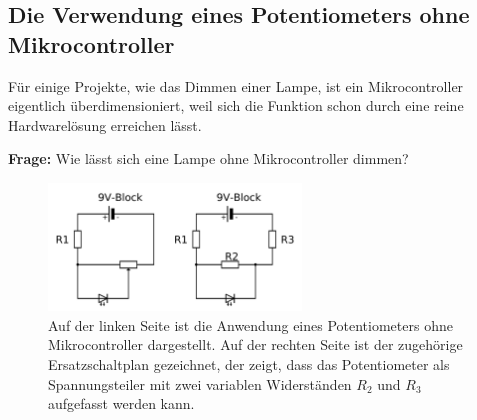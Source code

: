 \subsection{Die Verwendung eines Potentiometers ohne Mikrocontroller}

Für einige Projekte, wie das Dimmen einer Lampe, ist ein Mikrocontroller eigentlich überdimensioniert, weil sich die Funktion schon durch eine reine Hardwarelösung erreichen lässt.

\begin{ziel}
	\textbf{Frage:} Wie lässt sich eine Lampe ohne Mikrocontroller dimmen?
\end{ziel}

\begin{figure}[H]
	\centering
	\includegraphics[width=0.6\textwidth]{./Zeichnungen/potentiometer-anwendung.png}
	\caption{Auf der linken Seite ist die Anwendung eines Potentiometers ohne Mikrocontroller dargestellt. Auf der rechten Seite ist der zugehörige Ersatzschaltplan gezeichnet, der zeigt, dass das Potentiometer als Spannungsteiler mit zwei variablen Widerständen $R_2$ und $R_3$ aufgefasst werden kann.}
\end{figure}

